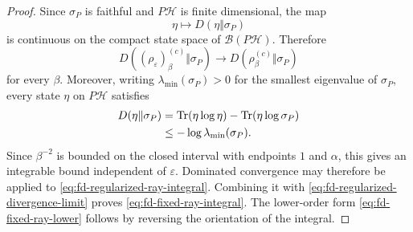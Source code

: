 \documentclass[10pt,a4paper]{amsart}
\DeclareMathOperator{\Tr}{Tr}
\newcommand{\cH}{\mathcal{H}}
\begin{document}
\begin{proof}
Since $\sigma_P$ is faithful and $P\cH$ is finite dimensional, the map
\[
  \eta\longmapsto D(\eta\Vert\sigma_P)
\]
is continuous on the compact state space of $\mathcal B(P\cH)$.
Therefore
\[
  D((\rho_\varepsilon)_\beta^{(c)}\Vert\sigma_P)
  \longrightarrow
  D(\rho_\beta^{(c)}\Vert\sigma_P)
\]
for every $\beta$.  Moreover, writing
$\lambda_{\min}(\sigma_P)>0$ for the smallest eigenvalue of
$\sigma_P$, every state $\eta$ on $P\cH$ satisfies
\begin{align}
  D(\eta\Vert\sigma_P)
  &=\Tr(\eta\log\eta)-\Tr(\eta\log\sigma_P) \notag\\
  &\leq-\log\lambda_{\min}(\sigma_P).
  \label{eq:fd-relative-entropy-uniform-bound}
\end{align}
Since $\beta^{-2}$ is bounded on the closed interval with endpoints
$1$ and $\alpha$, this gives an integrable bound independent of
$\varepsilon$.  Dominated convergence may therefore be applied to
\eqref{eq:fd-regularized-ray-integral}.  Combining it with
\eqref{eq:fd-regularized-divergence-limit} proves
\eqref{eq:fd-fixed-ray-integral}.  The lower-order form
\eqref{eq:fd-fixed-ray-lower} follows by reversing the orientation of
the integral.
\end{proof}
\end{document}
